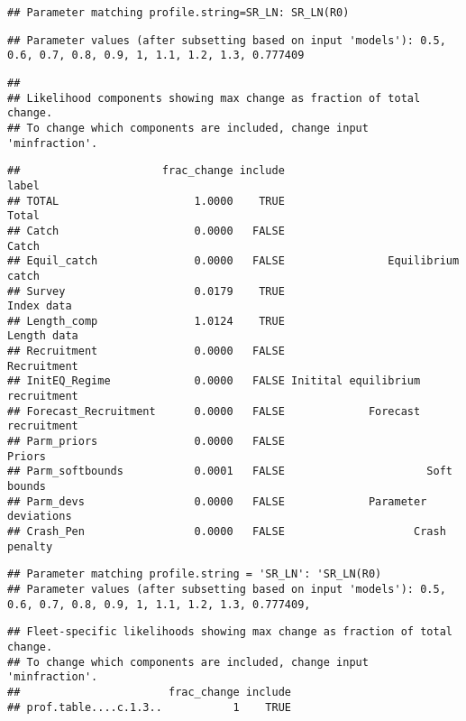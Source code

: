 \documentclass[
]{article}
\begin{document}
\begin{verbatim}
## Parameter matching profile.string=SR_LN: SR_LN(R0)
\end{verbatim}

\begin{verbatim}
## Parameter values (after subsetting based on input 'models'): 0.5, 0.6, 0.7, 0.8, 0.9, 1, 1.1, 1.2, 1.3, 0.777409
\end{verbatim}

\begin{verbatim}
## 
## Likelihood components showing max change as fraction of total change.
## To change which components are included, change input 'minfraction'.
\end{verbatim}

\begin{verbatim}
##                      frac_change include                            label
## TOTAL                     1.0000    TRUE                            Total
## Catch                     0.0000   FALSE                            Catch
## Equil_catch               0.0000   FALSE                Equilibrium catch
## Survey                    0.0179    TRUE                       Index data
## Length_comp               1.0124    TRUE                      Length data
## Recruitment               0.0000   FALSE                      Recruitment
## InitEQ_Regime             0.0000   FALSE Initital equilibrium recruitment
## Forecast_Recruitment      0.0000   FALSE             Forecast recruitment
## Parm_priors               0.0000   FALSE                           Priors
## Parm_softbounds           0.0001   FALSE                      Soft bounds
## Parm_devs                 0.0000   FALSE             Parameter deviations
## Crash_Pen                 0.0000   FALSE                    Crash penalty
\end{verbatim}

\begin{verbatim}
## Parameter matching profile.string = 'SR_LN': 'SR_LN(R0)
## Parameter values (after subsetting based on input 'models'): 0.5, 0.6, 0.7, 0.8, 0.9, 1, 1.1, 1.2, 1.3, 0.777409,
\end{verbatim}

\begin{verbatim}
## Fleet-specific likelihoods showing max change as fraction of total change.
## To change which components are included, change input 'minfraction'.
##                       frac_change include
## prof.table....c.1.3..           1    TRUE
\end{verbatim}
\end{document}
